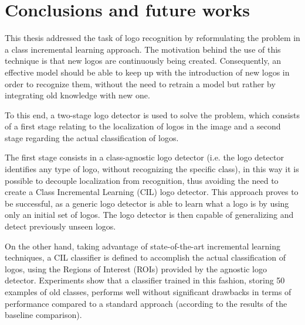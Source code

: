 \chapter{Conclusions and future works}
\label{chap:conclusions}

This thesis addressed the task of logo recognition by reformulating the problem in a class incremental learning approach.
The motivation behind the use of this technique is that new logos are continuously being created.
Consequently, an effective model should be able to keep up with the introduction of new logos in order to recognize them, without the need to retrain a model but rather by integrating old knowledge with new one.

To this end, a two-stage logo detector is used to solve the problem, which consists of a first stage relating to the localization of logos in the image and a second stage regarding the actual classification of logos.

The first stage consists in a class-agnostic logo detector (i.e. the logo detector identifies any type of logo, without recognizing the specific class), in this way it is possible to decouple localization from recognition, thus avoiding the need to create a Class Incremental Learning (CIL) logo detector. 
This approach proves to be successful, as a generic logo detector is able to learn what a logo is by using only an initial set of logos.
The logo detector is then capable of generalizing and detect previously unseen logos.

On the other hand, taking advantage of state-of-the-art incremental learning techniques, a CIL classifier is defined to accomplish the actual classification of logos, using the Regions of Interest (ROIs) provided by the agnostic logo detector.
Experiments show that a classifier trained in this fashion, storing 50 examples of old classes, performs well without significant drawbacks in terms of performance compared to a standard approach (according to the results of the baseline comparison).

